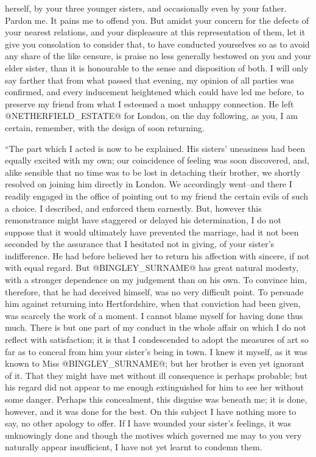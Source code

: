 herself, by your three younger sisters, and occasionally even by your
father. Pardon me. It pains me to offend you. But amidst your concern
for the defects of your nearest relations, and your displeasure at this
representation of them, let it give you consolation to consider that, to
have conducted yourselves so as to avoid any share of the like censure,
is praise no less generally bestowed on you and your elder sister, than
it is honourable to the sense and disposition of both. I will only say
farther that from what passed that evening, my opinion of all parties
was confirmed, and every inducement heightened which could have led
me before, to preserve my friend from what I esteemed a most unhappy
connection. He left @NETHERFIELD_ESTATE@ for London, on the day following, as
you, I am certain, remember, with the design of soon returning.

``The part which I acted is now to be explained. His sisters' uneasiness
had been equally excited with my own; our coincidence of feeling was
soon discovered, and, alike sensible that no time was to be lost in
detaching their brother, we shortly resolved on joining him directly in
London. We accordingly went--and there I readily engaged in the office
of pointing out to my friend the certain evils of such a choice. I
described, and enforced them earnestly. But, however this remonstrance
might have staggered or delayed his determination, I do not suppose
that it would ultimately have prevented the marriage, had it not been
seconded by the assurance that I hesitated not in giving, of your
sister's indifference. He had before believed her to return his
affection with sincere, if not with equal regard. But @BINGLEY_SURNAME@ has great
natural modesty, with a stronger dependence on my judgement than on his
own. To convince him, therefore, that he had deceived himself, was
no very difficult point. To persuade him against returning into
Hertfordshire, when that conviction had been given, was scarcely the
work of a moment. I cannot blame myself for having done thus much. There
is but one part of my conduct in the whole affair on which I do not
reflect with satisfaction; it is that I condescended to adopt the
measures of art so far as to conceal from him your sister's being in
town. I knew it myself, as it was known to Miss @BINGLEY_SURNAME@; but her
brother is even yet ignorant of it. That they might have met without
ill consequence is perhaps probable; but his regard did not appear to me
enough extinguished for him to see her without some danger. Perhaps this
concealment, this disguise was beneath me; it is done, however, and it
was done for the best. On this subject I have nothing more to say, no
other apology to offer. If I have wounded your sister's feelings, it
was unknowingly done and though the motives which governed me may to
you very naturally appear insufficient, I have not yet learnt to condemn
them.

